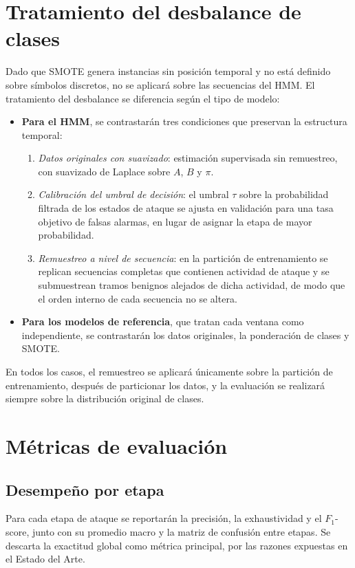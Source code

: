 \section{Tratamiento del desbalance de clases}
\label{sec:desbalance}
Dado que SMOTE genera instancias sin posición temporal y no está definido sobre símbolos discretos, no se aplicará sobre las secuencias del HMM. El tratamiento del desbalance se diferencia según el tipo de modelo:

\begin{itemize}
    \item \textbf{Para el HMM}, se contrastarán tres condiciones que preservan la estructura temporal:
    \begin{enumerate}
        \item \textit{Datos originales con suavizado}: estimación supervisada sin remuestreo, con suavizado de Laplace sobre $A$, $B$ y $\pi$.
        \item \textit{Calibración del umbral de decisión}: el umbral $\tau$ sobre la probabilidad filtrada de los estados de ataque se ajusta en validación para una tasa objetivo de falsas alarmas, en lugar de asignar la etapa de mayor probabilidad.
        \item \textit{Remuestreo a nivel de secuencia}: en la partición de entrenamiento se replican secuencias completas que contienen actividad de ataque y se submuestrean tramos benignos alejados de dicha actividad, de modo que el orden interno de cada secuencia no se altera.
    \end{enumerate}
    \item \textbf{Para los modelos de referencia}, que tratan cada ventana como independiente, se contrastarán los datos originales, la ponderación de clases y SMOTE.
\end{itemize}

En todos los casos, el remuestreo se aplicará únicamente sobre la partición de entrenamiento, después de particionar los datos, y la evaluación se realizará siempre sobre la distribución original de clases.

\section{Métricas de evaluación}

\subsection{Desempeño por etapa}
Para cada etapa de ataque se reportarán la precisión, la exhaustividad y el $F_1$-score, junto con su promedio macro y la matriz de confusión entre etapas. Se descarta la exactitud global como métrica principal, por las razones expuestas en el Estado del Arte.

